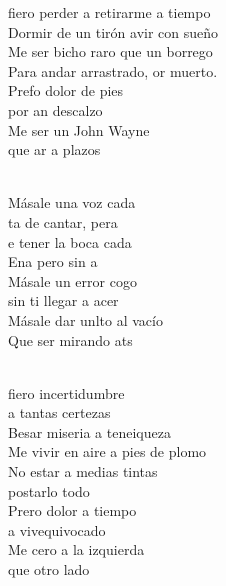 \documentclass[12pt]{article}
\begin{document}
\begin{multicols*}{2}
\begin{cancion}%
	fiero perder a retirarme a tiempo\\
	Dormir de un tirón avir con sueño\\
	Me ser bicho raro que un borrego\\
	Para andar arrastrado, or muerto.\\
	Prefo dolor de pies\\
	por an descalzo\\
	Me ser un John Wayne \\
	que ar a plazos \\\jump\\
	\begin{chorus}%
	Másale una voz cada\\
	ta de cantar, pera\\
	e tener la boca cada\\
	Ena pero sin a\\
	Másale un error cogo\\
	 sin ti llegar a acer\\
	Másale dar unlto al vacío  \\
	Que ser mirando ats\\
	\end{chorus}%
	\jump\\
	fiero incertidumbre \\
a tantas certezas\\
	Besar miseria a teneiqueza\\
	Me vivir en aire a pies de plomo\\
No estar a medias tintas \\
	postarlo todo\\
	Prero dolor a tiempo \\
	a vivequivocado\\
	Me cero a la izquierda \\
	que otro lado\\\jump\\

\end{cancion}
\end{multicols*}
\end{document}
